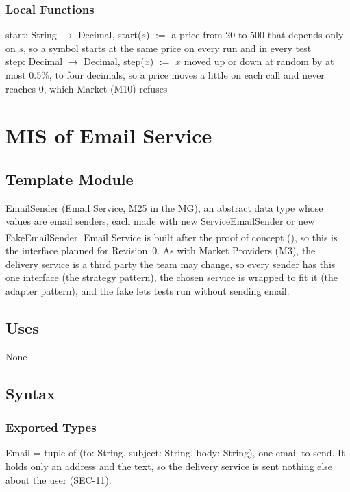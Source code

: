 \documentclass[12pt, titlepage]{article}
\begin{document}
\subsubsection{Local Functions}

\noindent start: String $\rightarrow$ Decimal, start($s$) $:=$ a price from 20
to 500 that depends only on $s$, so a symbol starts at the same price on every
run and in every test\\
step: Decimal $\rightarrow$ Decimal, step($x$) $:=$ $x$ moved up or down at
random by at most 0.5\%, to four decimals, so a price moves a little on each
call and never reaches 0, which Market (M10) refuses

\newpage

\section{MIS of Email Service} \label{MisEmail}

\begingroup\raggedright
\subsection{Template Module}

EmailSender (Email Service, M25 in the MG), an abstract data type whose values
are email senders, each made with new ServiceEmailSender or new
FakeEmailSender. Email Service is built after the proof of concept
(\textsuperscript{\dag}), so this is the interface planned for Revision~0. As
with Market Providers (M3), the delivery service is a third party the team may
change, so every sender has this one interface (the strategy pattern), the
chosen service is wrapped to fit it (the adapter pattern), and the fake lets
tests run without sending email.

\subsection{Uses}

None

\subsection{Syntax}

\subsubsection{Exported Types}

\noindent Email = tuple of (to: String, subject: String, body: String), one
email to send. It holds only an address and the text, so the delivery service
is sent nothing else about the user (SEC-11).
\end{document}
